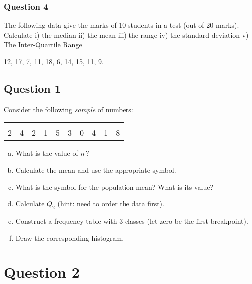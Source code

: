 \documentclass[]{report}
\begin{document}

\subsubsection{Question 4}
The following data give the marks of 10 students in a test (out of 20 marks). Calculate
i) the median    ii) the mean     iii) the range    iv) the standard deviation v) The Inter-Quartile Range

12, 17, 7, 11, 18, 6, 14, 15, 11, 9.
\subsection{Question 1}

Consider the following \emph{sample} of numbers:
\begin{center}
\begin{tabular}{|cccccccccc|}
\hline
&&&&&&&&&\\[-0.4cm]
2 & 4 & 2 & 1 & 5 & 3 & 0 & 4 & 1 & 8 \\
\hline
\end{tabular}
\end{center}
\begin{enumerate}[a)]\itemsep0.3cm
\item What is the value of $n$\,?
\item Calculate the mean and use the appropriate symbol.
\item What is the symbol for the population mean? What is its value?
\item Calculate $Q_2$ (hint: need to order the data first).
\item Construct a frequency table with 3 classes (let zero be the first breakpoint).
\item Draw the corresponding histogram.
\end{enumerate}





\section{Question 2}
\end{document}
